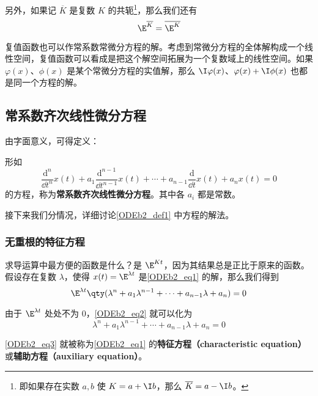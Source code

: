 另外，如果记 $\overline{K}$ 是复数 $K$ 的共轭\footnote{即如果存在实数 $a, b$ 使 $K=a+\I b$，那么 $\overline{K}=a-\I b$。}，那么我们还有
\begin{equation}
\E^{\overline{K}}=\overline{\E^K}
\end{equation}

复值函数也可以作常系数常微分方程的解。考虑到常微分方程的全体解构成一个线性空间，复值函数可以看成是把这个解空间拓展为一个复数域上的线性空间。如果 $\varphi(x)$、$\phi(x)$ 是某个常微分方程的实值解，那么 $\I\varphi(x)$、$\varphi(x)+\I \phi(x)$ 也都是同一个方程的解。


\subsection{常系数齐次线性微分方程}



由字面意义，可得定义：
\begin{definition}{}\label{ODEb2_def1}
形如
\begin{equation}\label{ODEb2_eq1}
\frac{\mathrm{d}^n}{\dd t^n}x(t)+a_1\frac{\mathrm{d}^{n-1}}{\dd t^{n-1}}x(t)+\cdots+a_{n-1}\frac{\mathrm{d}}{\dd t}x(t)+a_nx(t)=0
\end{equation}
的方程，称为\textbf{常系数齐次线性微分方程}。其中各 $a_i$ 都是常数。
\end{definition}

接下来我们分情况，详细讨论\autoref{ODEb2_def1} 中方程的解法。

\subsubsection{无重根的特征方程}


求导运算中最方便的函数是什么？是 $\E^{Kt}$，因为其结果总是正比于原来的函数。假设存在复数 $\lambda$，使得 $x(t)=\E^{\lambda t}$ 是\autoref{ODEb2_eq1} 的解，那么我们得到
\begin{equation}\label{ODEb2_eq2}
\E^{\lambda t}\qty(\lambda^n+a_1\lambda^{n-1}+\cdots+a_{n-1}\lambda+a_n)=0
\end{equation}

由于 $\E^{\lambda t}$ 处处不为 $0$，\autoref{ODEb2_eq2} 就可以化为
\begin{equation}\label{ODEb2_eq3}
\lambda^n+a_1\lambda^{n-1}+\cdots+a_{n-1}\lambda+a_n=0
\end{equation}

\autoref{ODEb2_eq3} 就被称为\autoref{ODEb2_eq1} 的\textbf{特征方程（characteristic equation）}或\textbf{辅助方程（auxiliary equation）}。

